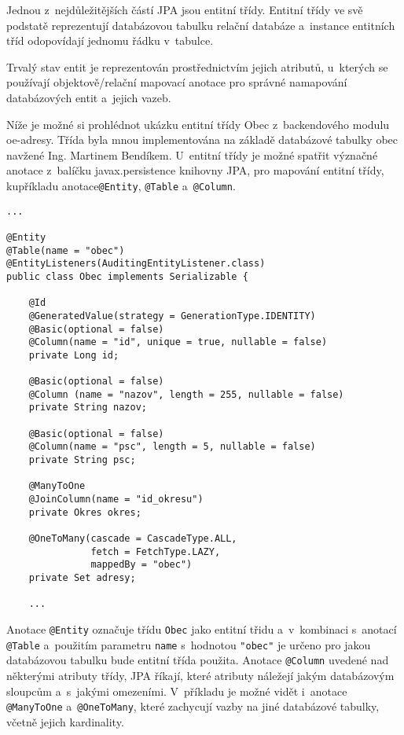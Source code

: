\documentclass[12pt]{article}
\begin{document}
Jednou z~nejdůležitějších částí JPA jsou entitní třídy.
Entitní třídy ve svě podstatě reprezentují databázovou tabulku
relační databáze a~instance entitních tříd odopovídají jednomu řádku v~tabulce.

Trvalý stav entit je reprezentován prostřednictvím jejich atributů,
u~kterých se používají objektově/relační mapovací anotace 
pro správné namapování databázových entit a~jejich vazeb.

Níže je možné si prohlédnot ukázku entitní třídy Obec z~backendového 
modulu oe-adresy. Třída byla mnou implementována na základě databázové tabulky 
obec navžené Ing. Martinem Bendíkem. U~entitní třídy je možné spatřit 
význačné anotace z~balíčku javax.persistence knihovny JPA,
pro mapování entitní třídy, kupříkladu anotace\texttt{@Entity}, \texttt{@Table}
a~\texttt{@Column}. 

\begin{lstlisting}
...

@Entity
@Table(name = "obec")
@EntityListeners(AuditingEntityListener.class)
public class Obec implements Serializable {

    @Id
    @GeneratedValue(strategy = GenerationType.IDENTITY)
    @Basic(optional = false)
    @Column(name = "id", unique = true, nullable = false)
    private Long id;
    
    @Basic(optional = false)
    @Column (name = "nazov", length = 255, nullable = false)
    private String nazov;
     
    @Basic(optional = false) 
    @Column(name = "psc", length = 5, nullable = false)
    private String psc; 
    
    @ManyToOne
    @JoinColumn(name = "id_okresu")  
    private Okres okres; 
    
    @OneToMany(cascade = CascadeType.ALL,
               fetch = FetchType.LAZY,
               mappedBy = "obec")   
    private Set adresy;
    
    ...
\end{lstlisting}

Anotace \texttt{@Entity} označuje třídu \texttt{Obec}
jako entitní třidu a~v~kombinaci s~anotací \texttt{@Table} 
a~použitím parametru \texttt{name} s~hodnotou \texttt{"obec"} je určeno pro jakou databázovou tabulku bude entitní třída použita.
Anotace \texttt{@Column} uvedené nad některými atributy třídy,
JPA říkají, které atributy náležejí jakým databázovým sloupcům a~s~jakými omezeními.
V~příkladu je možné vidět i~anotace \texttt{@ManyToOne} a~\texttt{@OneToMany},
které zachycují vazby na jiné databázové tabulky, včetně jejich kardinality.
\end{document}
